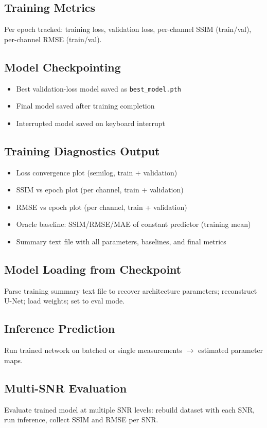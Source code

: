 \documentclass[11pt,a4paper]{article}
\begin{document}
\subsection{Training Metrics}
Per epoch tracked: training loss, validation loss, per-channel SSIM (train/val), per-channel RMSE (train/val).

\subsection{Model Checkpointing}
\begin{itemize}[nosep]
  \item Best validation-loss model saved as \texttt{best\_model.pth}
  \item Final model saved after training completion
  \item Interrupted model saved on keyboard interrupt
\end{itemize}

\subsection{Training Diagnostics Output}
\begin{itemize}[nosep]
  \item Loss convergence plot (semilog, train + validation)
  \item SSIM vs epoch plot (per channel, train + validation)
  \item RMSE vs epoch plot (per channel, train + validation)
  \item Oracle baseline: SSIM/RMSE/MAE of constant predictor (training mean)
  \item Summary text file with all parameters, baselines, and final metrics
\end{itemize}

\subsection{Model Loading from Checkpoint}
Parse training summary text file to recover architecture parameters; reconstruct U-Net; load weights; set to eval mode.

\subsection{Inference Prediction}
Run trained network on batched or single measurements $\rightarrow$ estimated parameter maps.

\subsection{Multi-SNR Evaluation}
Evaluate trained model at multiple SNR levels: rebuild dataset with each SNR, run inference, collect SSIM and RMSE per SNR.
\end{document}
